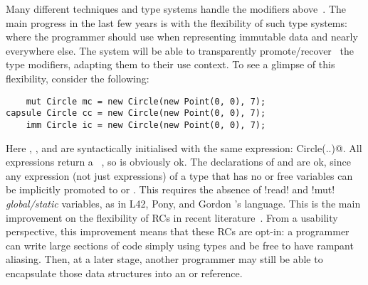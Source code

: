 \noindent Many different techniques and type systems handle the modifiers above~\cite{ZibinEtAl10,ClarkeWrigstad03,HallerOdersky10,GordonEtAl12,ServettoZucca15}.
The main progress in the last few years is with the flexibility of such type systems:
 where the programmer should use \Q@imm@ when  representing immutable data
and \Q@mut@ nearly everywhere else. The system will be able to transparently promote/recover~\cite{GordonEtAl12,clebsch2015deny,ServettoZucca15} the type modifiers, adapting them to their use context.
To see a glimpse of this flexibility, consider the following:
\begin{lstlisting}
    mut Circle mc = new Circle(new Point(0, 0), 7);
capsule Circle cc = new Circle(new Point(0, 0), 7);
    imm Circle ic = new Circle(new Point(0, 0), 7);
\end{lstlisting}
Here \Q@mc@, \Q@cc@, and \Q@ic@ are syntactically initialised with the same expression: \Q@new Circle(..)@. All
\Q@new@ expressions return a \Q@mut@~\cite{clebsch2015deny,GIANNINI2019145}, so \Q@mc@ is obviously ok. The declarations of \Q@cc@ and \Q@ic@ are ok, since 
any expression (not just \Q@new@ expressions) 
of a \Q@mut@ type that has no \Q@mut@ or \Q@read@ free 
variables can be implicitly promoted to \Q@capsule@ or \Q@imm@.
This requires the absence of \Q!read! and \Q!mut! \emph{global/static} variables, as in L42, Pony, and Gordon \etal's language.
This is the main improvement on the flexibility of RCs in recent literature~\cite{ServettoEtAl13a,ServettoZucca15,GordonEtAl12,clebsch2015deny,clebsch2017orca}.
From a usability perspective, this improvement means that
these RCs are opt-in: a programmer can write large sections of code
simply using \Q@mut@ types and be free to have rampant aliasing. 
Then, at a later stage, another programmer may still 
be able to encapsulate those data structures into an \Q@imm@ or \Q@capsule@ reference.

